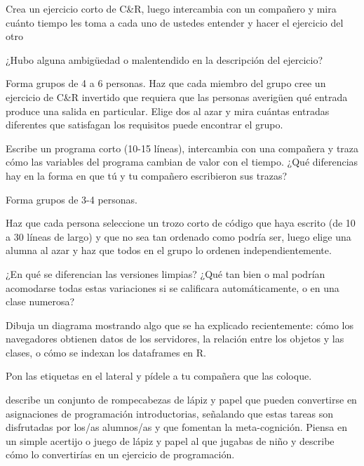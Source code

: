 

Crea un ejercicio corto de C\&R, 
luego intercambia con un compañero 
y mira cuánto tiempo les toma a cada uno de ustedes entender y hacer el ejercicio del otro

¿Hubo alguna ambigüedad o malentendido en la descripción del ejercicio?


Forma grupos de 4 a 6 personas.
Haz que cada miembro del grupo cree un ejercicio de C\&R invertido que requiera que las personas averigüen qué entrada produce una salida en particular.
Elige dos al azar 
y mira cuántas entradas diferentes que satisfagan los requisitos puede encontrar el grupo.


Escribe un programa corto (10-15 líneas),
 intercambia con una compañera y 
traza cómo las variables del programa cambian de valor con el tiempo.
¿Qué diferencias hay en la forma en que tú y tu compañero escribieron sus trazas?


Forma grupos de 3-4 personas.

Haz que cada persona seleccione un trozo corto de código que haya escrito  (de 10 a 30 líneas de largo) y que no sea tan ordenado como podría ser, 
luego elige una alumna al azar y haz que todos en el grupo lo ordenen independientemente.

¿En qué se diferencian las versiones limpias?
¿Qué tan bien o mal podrían acomodarse todas estas variaciones si se calificara automáticamente, o en una clase numerosa?


Dibuja un diagrama mostrando algo que se ha explicado recientemente: cómo los navegadores obtienen datos de los servidores, la relación entre los objetos y las clases,
o cómo se indexan los dataframes en R.

Pon las etiquetas en el lateral y pídele a tu compañera que las coloque.


\cite{Butl2017} describe un conjunto de rompecabezas de lápiz y papel que pueden convertirse en asignaciones de programación introductorias, señalando que estas tareas son disfrutadas por los/as alumnos/as y que fomentan la meta-cognición.
Piensa en un simple acertijo o juego de lápiz y papel al que jugabas de niño 
y describe cómo lo convertirías en un ejercicio de programación.

